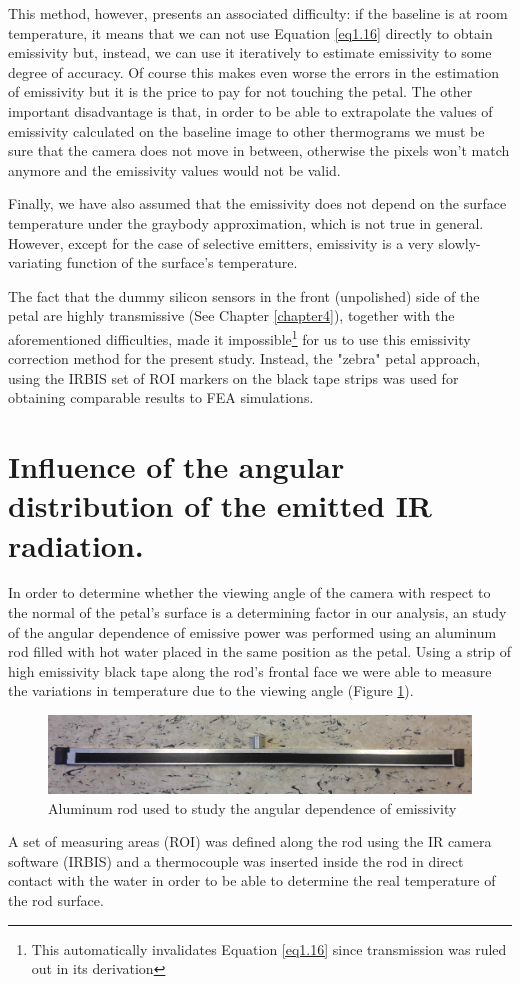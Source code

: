 		This method, however, presents an associated difficulty: if the baseline is at room temperature, it means that we can not use Equation \ref{eq1.16} directly to obtain emissivity but, instead, we can use it iteratively to estimate emissivity to some degree of accuracy. Of course this makes even worse the errors in the estimation of emissivity but it is the price to pay for not touching the petal. The other important disadvantage is that, in order to be able to extrapolate the values of emissivity calculated on the baseline image to other thermograms we must be sure that the camera does not move in between, otherwise the pixels won’t match anymore and the emissivity values would not be valid.
		
		Finally, we have also assumed that the emissivity does not depend on the surface temperature under the graybody approximation, which is not true in general. However, except for the case of selective emitters, emissivity is a very slowly-variating function of the surface’s temperature.
		
		The fact that the dummy silicon sensors in the front (unpolished) side of the petal are highly transmissive (See Chapter \ref{chapter4}), together with the aforementioned difficulties, made it impossible\footnote{{\footnotesize This automatically invalidates Equation \ref{eq1.16} since transmission was ruled out in its derivation}} for us to use this emissivity correction method for the present study. Instead, the "zebra" petal approach, using the IRBIS set of ROI markers on the black tape strips was used for obtaining comparable results to FEA simulations.\bigskip
		
	\section{Influence of the angular distribution of the emitted IR radiation.}\label{section3.4}
	
		In order to determine whether the viewing angle of the camera with respect to the normal of the petal's surface is a determining factor in our analysis, an study of the angular dependence of emissive power was performed using an aluminum rod filled with hot water placed in the same position as the petal. Using a strip of high emissivity black tape along the rod’s frontal face we were able to measure the variations in temperature due to the viewing angle (Figure \ref{fig3.4}).
	
		\begin{figure}[H]
			\centering
			\captionsetup{justification=centering,margin=2cm}
			\includegraphics[scale=0.30]{Figures/Chapter03/AluminumRod.jpg}
			\caption{Aluminum rod used to study the angular dependence of emissivity}\label{fig3.4}
		\end{figure}		
		
		A set of measuring areas (ROI) was defined along the rod using the IR camera software (IRBIS) and a thermocouple was inserted inside the rod in direct contact with the water in order to be able to determine the real temperature of the rod surface.
	
	